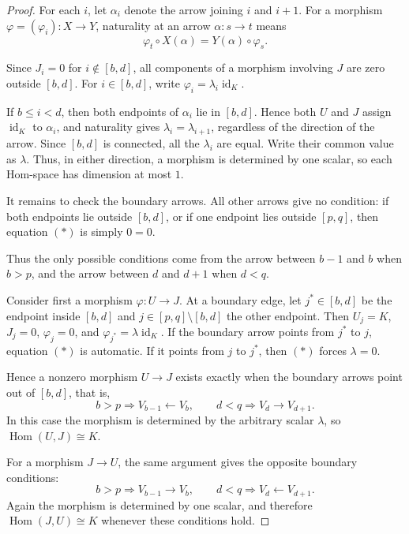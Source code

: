 \documentclass[11pt]{amsart}
\numberwithin{equation}{section}
\theoremstyle{definition}
\begin{document}
\begin{proof}
For each $i$, let $\alpha_i$ denote the arrow joining $i$ and $i+1$.
For a morphism $\varphi=(\varphi_i)\colon X\to Y$, naturality at an arrow
$\alpha\colon s\to t$ means
\[
\varphi_t\circ X(\alpha)=Y(\alpha)\circ\varphi_s. \tag{$*$}
\]

Since $J_i=0$ for $i\notin[b,d]$, all components of a morphism involving $J$
are zero outside $[b,d]$. For $i\in[b,d]$, write
$\varphi_i=\lambda_i\operatorname{id}_K$.

If $b\le i<d$, then both endpoints of $\alpha_i$ lie in $[b,d]$. Hence both
$U$ and $J$ assign $\operatorname{id}_K$ to $\alpha_i$, and naturality gives
$\lambda_i=\lambda_{i+1}$, regardless of the direction of the arrow.
Since $[b,d]$ is connected, all the $\lambda_i$ are equal. Write their common
value as $\lambda$. Thus, in either direction, a morphism is determined by one
scalar, so each Hom-space has dimension at most $1$.

It remains to check the boundary arrows. All other arrows give no condition:
if both endpoints lie outside $[b,d]$, or if one endpoint lies outside
$[p,q]$, then equation $(*)$ is simply $0=0$.

Thus the only possible conditions come from the arrow between $b-1$ and $b$
when $b>p$, and the arrow between $d$ and $d+1$ when $d<q$.

Consider first a morphism $\varphi\colon U\to J$. At a boundary edge, let
$j^*\in[b,d]$ be the endpoint inside $[b,d]$ and
$j\in[p,q]\setminus[b,d]$ the other endpoint. Then
$U_j=K$, $J_j=0$, $\varphi_j=0$, and
$\varphi_{j^*}=\lambda\operatorname{id}_K$.
If the boundary arrow points from $j^*$ to $j$, equation $(*)$ is automatic.
If it points from $j$ to $j^*$, then $(*)$ forces $\lambda=0$.

Hence a nonzero morphism $U\to J$ exists exactly when the boundary arrows
point out of $[b,d]$, that is,
\[
b>p\Longrightarrow V_{b-1}\longleftarrow V_b,
\qquad
d<q\Longrightarrow V_d\longrightarrow V_{d+1}.
\]
In this case the morphism is determined by the arbitrary scalar $\lambda$, so
$\operatorname{Hom}(U,J)\cong K$.

For a morphism $J\to U$, the same argument gives the opposite boundary
conditions:
\[
b>p\Longrightarrow V_{b-1}\longrightarrow V_b,
\qquad
d<q\Longrightarrow V_d\longleftarrow V_{d+1}.
\]
Again the morphism is determined by one scalar, and therefore
$\operatorname{Hom}(J,U)\cong K$ whenever these conditions hold.
\end{proof}
\end{document}
